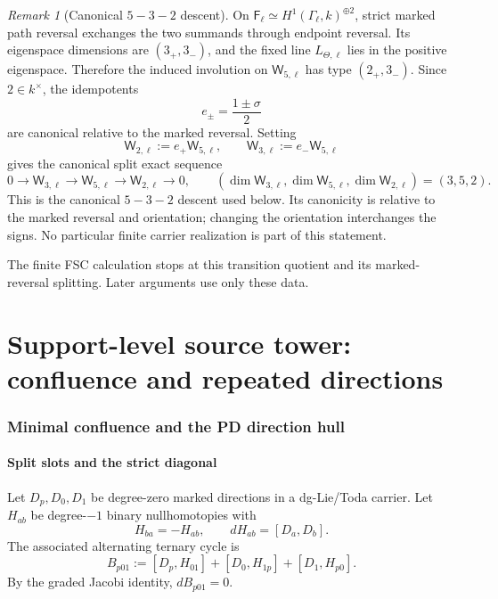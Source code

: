 \documentclass[11pt]{article}
\theoremstyle{remark}
\newtheorem{remark}[theorem]{Remark}
\begin{document}
\begin{remark}[Canonical \(5\!-\!3\!-\!2\) descent]
\label{P1L-rem:canonical-5-3-2-descent}
On \(\mathsf F_\ell\simeq H^1(\Gamma_\ell,k)^{\oplus2}\), strict marked
path reversal exchanges the two summands through endpoint reversal.  Its
eigenspace dimensions are \((3_+,3_-)\), and the fixed line
\(L_{\Theta,\ell}\) lies in the positive eigenspace.  Therefore the induced
involution on \(\mathsf W_{5,\ell}\) has type \((2_+,3_-)\).  Since
\(2\in k^\times\), the idempotents
\[
 e_\pm=\frac{1\pm\sigma}{2}
\]
are canonical relative to the marked reversal.  Setting
\[
 \mathsf W_{2,\ell}:=e_+\mathsf W_{5,\ell},
 \qquad
 \mathsf W_{3,\ell}:=e_-\mathsf W_{5,\ell}
\]
gives the canonical split exact sequence
\[
 0\longrightarrow\mathsf W_{3,\ell}
 \longrightarrow\mathsf W_{5,\ell}
 \longrightarrow\mathsf W_{2,\ell}
 \longrightarrow0,
 \qquad
 (\dim\mathsf W_{3,\ell},\dim\mathsf W_{5,\ell},
 \dim\mathsf W_{2,\ell})=(3,5,2).
\]
This is the canonical \(5\!-\!3\!-\!2\) descent used below.  Its
canonicity is relative to the marked reversal and orientation; changing the
orientation interchanges the signs.  No particular finite carrier
realization is part of this statement.
\end{remark}

The finite FSC calculation stops at this transition quotient and its marked-reversal
splitting.  Later arguments use only these data.

\part{Support-level source tower: confluence and repeated directions}
\section{Minimal confluence and the PD direction hull}

\subsection{Split slots and the strict diagonal}
Let $D_p,D_0,D_1$ be degree-zero marked directions in a dg-Lie/Toda carrier.  Let $H_{ab}$ be degree-$-1$ binary nullhomotopies with
\[
 H_{ba}=-H_{ab},\qquad dH_{ab}=[D_a,D_b].
\]
The associated alternating ternary cycle is
\begin{equation}\label{P1C-eq:confluent-split-B}
 B_{p01}:=[D_p,H_{01}]+[D_0,H_{1p}]+[D_1,H_{p0}].
\end{equation}
By the graded Jacobi identity, $dB_{p01}=0$.
\end{document}
